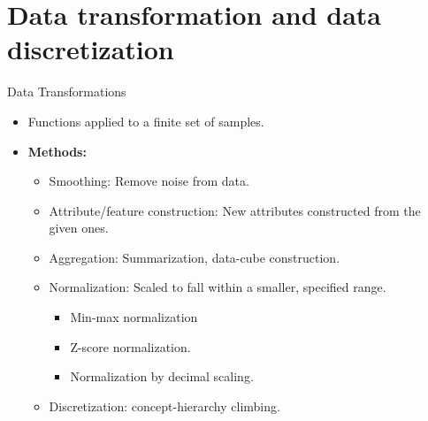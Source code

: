 \section{Data transformation and data discretization}

\begin{frame}{Data Transformations}
	\begin{itemize}
		\item Functions applied to a finite set of samples.
		\item \textbf{Methods:}
		      \begin{itemize}
			      \item Smoothing: Remove noise from data.
			      \item Attribute/feature construction: New attributes constructed
			            from the given ones.
			      \item Aggregation: Summarization, data-cube construction.
			      \item Normalization: Scaled to fall within a smaller, specified
			            range.
			            \begin{itemize}
				            \item Min-max normalization
				            \item Z-score normalization.
				            \item Normalization by decimal scaling.
			            \end{itemize}
			      \item Discretization: concept-hierarchy climbing.
		      \end{itemize}
	\end{itemize}
\end{frame}

